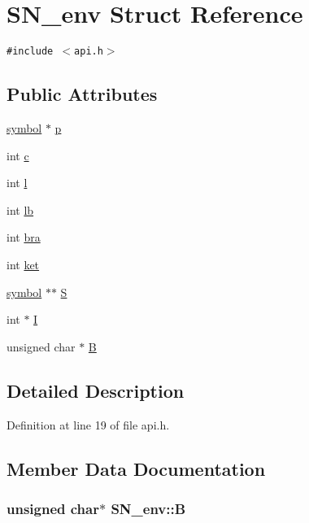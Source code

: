 \hypertarget{structSN__env}{
\section{SN\_\-env Struct Reference}
\label{structSN__env}
}
{\tt \#include $<$api.h$>$}

\subsection*{Public Attributes}
\begin{CompactItemize}
\item 
\hyperlink{api_8h_04438e24473719aaf288c57833717164}{symbol} $\ast$ \hyperlink{structSN__env_400280a08e61d3139b32bf9ac06eac59}{p}
\item 
int \hyperlink{structSN__env_8b785d9fa1ff1610fe2b5d9e85207df6}{c}
\item 
int \hyperlink{structSN__env_ebb292b34aa233b42d32074e254dc754}{l}
\item 
int \hyperlink{structSN__env_17fa8ef44090bbfd74755377b15194a7}{lb}
\item 
int \hyperlink{structSN__env_9768d567ce5406809557aeb40cad873e}{bra}
\item 
int \hyperlink{structSN__env_838739ee60904661873995471c80bac5}{ket}
\item 
\hyperlink{api_8h_04438e24473719aaf288c57833717164}{symbol} $\ast$$\ast$ \hyperlink{structSN__env_ef140037972032bceeebebf53cc53d68}{S}
\item 
int $\ast$ \hyperlink{structSN__env_73c996c34c706b1c11a4b3b273d99f35}{I}
\item 
unsigned char $\ast$ \hyperlink{structSN__env_11c62ffd6547f724623fa5bab2114794}{B}
\end{CompactItemize}


\subsection{Detailed Description}


Definition at line 19 of file api.h.

\subsection{Member Data Documentation}
\hypertarget{structSN__env_11c62ffd6547f724623fa5bab2114794}{
\subsubsection[{B}]{\setlength{\rightskip}{0pt plus 5cm}unsigned char$\ast$ {\bf SN\_\-env::B}}}
\label{structSN__env_11c62ffd6547f724623fa5bab2114794}




